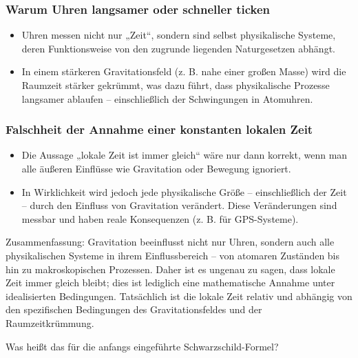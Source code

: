 \documentclass[a4paper,12pt]{article}
\begin{document}
	\subsubsection{Warum Uhren langsamer oder schneller ticken}
	\begin{itemize}
		\item Uhren messen nicht nur „Zeit“, sondern sind selbst physikalische Systeme, deren Funktionsweise von den zugrunde liegenden Naturgesetzen abhängt.
		\item In einem stärkeren Gravitationsfeld (z. B. nahe einer großen Masse) wird die Raumzeit stärker gekrümmt, was dazu führt, dass physikalische Prozesse langsamer ablaufen – einschließlich der Schwingungen in Atomuhren.
	\end{itemize}
	
	\subsubsection{Falschheit der Annahme einer konstanten lokalen Zeit}
	\begin{itemize}
		\item Die Aussage „lokale Zeit ist immer gleich“ wäre nur dann korrekt, wenn man alle äußeren Einflüsse wie Gravitation oder Bewegung ignoriert.
		\item In Wirklichkeit wird jedoch jede physikalische Größe – einschließlich der Zeit – durch den Einfluss von Gravitation verändert. Diese Veränderungen sind messbar und haben reale Konsequenzen (z. B. für GPS-Systeme).
	\end{itemize}
	
	Zusammenfassung: Gravitation beeinflusst nicht nur Uhren, sondern auch alle physikalischen Systeme in ihrem Einflussbereich – von atomaren Zuständen bis hin zu makroskopischen Prozessen. Daher ist es ungenau zu sagen, dass lokale Zeit immer gleich bleibt; dies ist lediglich eine mathematische Annahme unter idealisierten Bedingungen. Tatsächlich ist die lokale Zeit relativ und abhängig von den spezifischen Bedingungen des Gravitationsfeldes und der Raumzeitkrümmung.
	
	Was heißt das für die anfangs eingeführte Schwarzschild-Formel?
	
\end{document}
